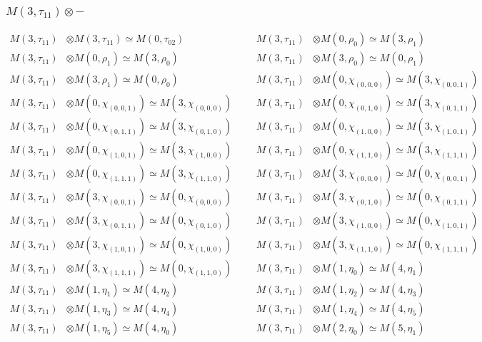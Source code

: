 \subsubsection{$ M(3,\tau_{11})\otimes -$}
\begin{align*}
M(3,\tau_{11}) &\otimes M(3,\tau_{11}) \simeq M(0,\tau_{02}) &&& M(3,\tau_{11}) &\otimes M(0,\rho_{0}) \simeq M(3,\rho_{1})\\
M(3,\tau_{11}) &\otimes M(0,\rho_{1}) \simeq M(3,\rho_{0}) &&& M(3,\tau_{11}) &\otimes M(3,\rho_{0}) \simeq M(0,\rho_{1})\\
M(3,\tau_{11}) &\otimes M(3,\rho_{1}) \simeq M(0,\rho_{0}) &&& M(3,\tau_{11}) &\otimes M(0,\chi_{(0,0,0)}) \simeq M(3,\chi_{(0,0,1)})\\
M(3,\tau_{11}) &\otimes M(0,\chi_{(0,0,1)}) \simeq M(3,\chi_{(0,0,0)}) &&& M(3,\tau_{11}) &\otimes M(0,\chi_{(0,1,0)}) \simeq M(3,\chi_{(0,1,1)})\\
M(3,\tau_{11}) &\otimes M(0,\chi_{(0,1,1)}) \simeq M(3,\chi_{(0,1,0)}) &&& M(3,\tau_{11}) &\otimes M(0,\chi_{(1,0,0)}) \simeq M(3,\chi_{(1,0,1)})\\
M(3,\tau_{11}) &\otimes M(0,\chi_{(1,0,1)}) \simeq M(3,\chi_{(1,0,0)}) &&& M(3,\tau_{11}) &\otimes M(0,\chi_{(1,1,0)}) \simeq M(3,\chi_{(1,1,1)})\\
M(3,\tau_{11}) &\otimes M(0,\chi_{(1,1,1)}) \simeq M(3,\chi_{(1,1,0)}) &&& M(3,\tau_{11}) &\otimes M(3,\chi_{(0,0,0)}) \simeq M(0,\chi_{(0,0,1)})\\
M(3,\tau_{11}) &\otimes M(3,\chi_{(0,0,1)}) \simeq M(0,\chi_{(0,0,0)}) &&& M(3,\tau_{11}) &\otimes M(3,\chi_{(0,1,0)}) \simeq M(0,\chi_{(0,1,1)})\\
M(3,\tau_{11}) &\otimes M(3,\chi_{(0,1,1)}) \simeq M(0,\chi_{(0,1,0)}) &&& M(3,\tau_{11}) &\otimes M(3,\chi_{(1,0,0)}) \simeq M(0,\chi_{(1,0,1)})\\
M(3,\tau_{11}) &\otimes M(3,\chi_{(1,0,1)}) \simeq M(0,\chi_{(1,0,0)}) &&& M(3,\tau_{11}) &\otimes M(3,\chi_{(1,1,0)}) \simeq M(0,\chi_{(1,1,1)})\\
M(3,\tau_{11}) &\otimes M(3,\chi_{(1,1,1)}) \simeq M(0,\chi_{(1,1,0)}) &&& M(3,\tau_{11}) &\otimes M(1,\eta_{0}) \simeq M(4,\eta_{1})\\
M(3,\tau_{11}) &\otimes M(1,\eta_{1}) \simeq M(4,\eta_{2}) &&& M(3,\tau_{11}) &\otimes M(1,\eta_{2}) \simeq M(4,\eta_{3})\\
M(3,\tau_{11}) &\otimes M(1,\eta_{3}) \simeq M(4,\eta_{4}) &&& M(3,\tau_{11}) &\otimes M(1,\eta_{4}) \simeq M(4,\eta_{5})\\
M(3,\tau_{11}) &\otimes M(1,\eta_{5}) \simeq M(4,\eta_{0}) &&& M(3,\tau_{11}) &\otimes M(2,\eta_{0}) \simeq M(5,\eta_{1})\\

\end{align*}
